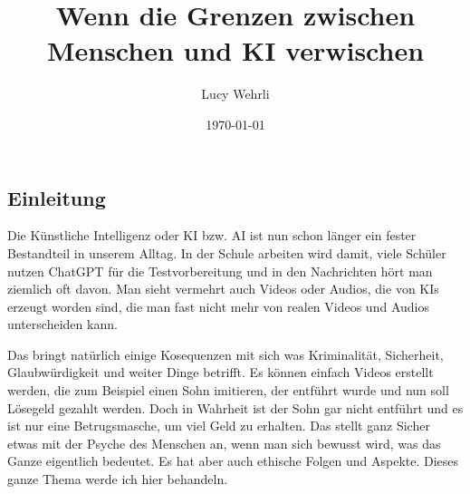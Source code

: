\documentclass{report}
\title{Wenn die Grenzen zwischen Menschen und KI verwischen}
\author{Lucy Wehrli}
\date{\today}
\begin{document}
\maketitle


\tableofcontents

\chapter{}
\section{Einleitung}

Die Künstliche Intelligenz oder KI bzw. AI ist nun schon länger ein fester Bestandteil in unserem Alltag. In der Schule arbeiten wird damit, viele Schüler nutzen ChatGPT für die Testvorbereitung und in den Nachrichten hört man ziemlich oft davon. Man sieht vermehrt auch Videos oder Audios, die von KIs erzeugt worden sind, die man fast nicht mehr von realen Videos und Audios unterscheiden kann.
\par 
Das bringt natürlich einige Kosequenzen mit sich was Kriminalität, Sicherheit, Glaubwürdigkeit und weiter Dinge betrifft. Es können einfach Videos erstellt werden, die zum Beispiel einen Sohn imitieren, der entführt wurde und nun soll Lösegeld gezahlt werden. Doch in Wahrheit ist der Sohn gar nicht entführt und es ist nur eine Betrugsmasche, um viel Geld zu erhalten. Das stellt ganz Sicher etwas mit der Psyche des Menschen an, wenn man sich bewusst wird, was das Ganze eigentlich bedeutet. Es hat aber auch ethische Folgen und Aspekte. Dieses ganze Thema werde ich hier behandeln.
\end{document}
